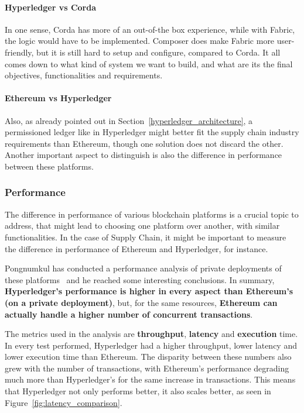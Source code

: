 \paragraph{Hyperledger vs Corda} In one sense, Corda has more of an out-of-the box experience, while with Fabric, the logic would have to be implemented. Composer does make Fabric more user-friendly, but it is still hard to setup and configure, compared to Corda. It all comes down to what kind of system we want to build, and what are its the final objectives, functionalities and requirements.

\paragraph{Ethereum vs Hyperledger} Also, as already pointed out in Section~\ref{hyperledger_architecture}, a permissioned ledger like in Hyperledger might better fit the supply chain industry requirements than Ethereum, though one solution does not discard the other. Another important aspect to distinguish is also the difference in performance between these platforms.



\subsubsection{Performance}
\label{sec-performance-comparison}
The difference in performance of various blockchain platforms is a crucial topic to address, that might lead to choosing one platform over another, with similar functionalities. In the case of Supply Chain, it might be important to measure the difference in performance of Ethereum and Hyperledger, for instance. 

Pongnumkul has conducted a performance analysis of private deployments of these platforms~\cite{Pongnumkul2017} and he reached some interesting conclusions. In summary, \textbf{Hyperledger's performance is higher in every aspect than Ethereum's (on a private deployment)}, but, for the same resources, \textbf{Ethereum can actually handle a higher number of concurrent transactions}. 

The metrics used in the analysis are \textbf{throughput}, \textbf{latency} and \textbf{execution} time.
In every test performed, Hyperledger had a higher throughput, lower latency and lower execution time than Ethereum. The disparity between these numbers also grew with the number of transactions, with Ethereum's performance degrading much more than Hyperledger's for the same increase in transactions. This means that Hyperledger not only performs better, it also scales better, as seen in Figure~\ref{fig:latency_comparison}.

